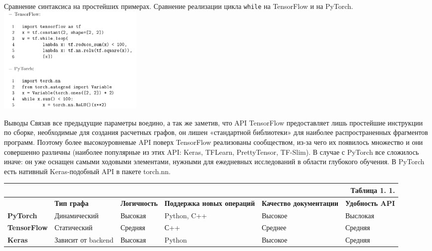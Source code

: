 \documentclass[aspectratio=169]{beamer}
\begin{document}
\begin{frame}{Сравнение синтаксиса на простейших примерах.}
	Сравнение реализации цикла \verb"while" на TensorFlow и на PyTorch.
	\includegraphics[width=200pt]{code.png}

\end{frame}

\begin{frame}{Выводы}
Связав все предыдущие параметры воедино, а так же заметив, что API TensorFlow предоставляет лишь простейшие инструкции по сборке, необходимые для создания расчетных графов, он лишен «стандартной библиотеки» для наиболее распространенных фрагментов программ. Поэтому более высокоуровневые API поверх TensorFlow реализованы сообществом, из-за чего их появилось множество и они совершенно различны (наиболее популярные из этих API: Keras, TFLearn, PrettyTensor, TF-Slim). В случае с PyTorch все сложилось иначе: он уже оснащен самыми ходовыми элементами, нужными для ежедневных исследований в области глубокого обучения. В PyTorch есть нативный Keras-подобный API в пакете torch.nn.
\end{frame}

\begin{frame}
\begin{tabular}[t]{| p{52pt} | p{65pt} | p{57pt} | p{54pt} | p{50pt} | p{50pt} |}
	\multicolumn{6}{r}{Таблица 1. 1.}\\
	\hline
	& \bf{Тип графа} & \bf{Логичность} & \bf{Поддержка новых операций} & \bf{Качество документации} & \bf{Удобность API} \\
	\hline
	\bf{PyTorch} & Динамический & Высокая & Python, C++ &  Высокое & Выслокая\\
	\hline
	\bf{TensorFlow} & Статический & Средняя & С++ & Среднее & Средняя\\
	\hline
	\bf{Keras} & Зависит от backend & Высокая & Python & Высокое & Средняя\\
	\hline
\end{tabular}
\end{frame}
\end{document}
